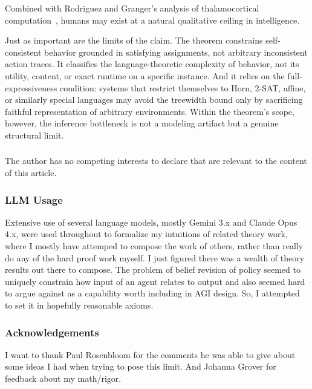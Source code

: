 \documentclass[runningheads]{llncs}
\begin{document}
Combined with Rodriguez and Granger's analysis of thalamocortical computation~\cite{Rodriguez16}, humans may exist at a natural qualitative ceiling in intelligence.

Just as important are the limits of the claim. The theorem constrains self-consistent behavior grounded in satisfying assignments, not arbitrary inconsistent action traces. It classifies the language-theoretic complexity of behavior, not its utility, content, or exact runtime on a specific instance. And it relies on the full-expressiveness condition: systems that restrict themselves to Horn, 2-SAT, affine, or similarly special languages may avoid the treewidth bound only by sacrificing faithful representation of arbitrary environments. Within the theorem's scope, however, the inference bottleneck is not a modeling artifact but a genuine structural limit.

\begin{credits}
\subsubsection{\discintname}
The author has no competing interests to declare that are relevant to the content of this article.
\subsubsection{LLM Usage}
Extensive use of several language models, mostly Gemini 3.x and Claude Opus 4.x, were used throughout to formalize my intuitions of related theory work, where I mostly have attemped to compose the work of others, rather than really do any of the hard proof work myself. I just figured there was a wealth of theory results out there to compose. The problem of belief revision of policy seemed to uniquely constrain how input of an agent relates to output and also seemed hard to argue against as a capability worth including in AGI design. So, I attempted to set it in hopefully reasonable axioms.
\subsubsection{Acknowledgements}
I want to thank Paul Rosenbloom for the comments he was able to give about some ideas I had when trying to pose this limit. And Johanna Grover for feedback about my math/rigor.
\end{credits}
\end{document}
